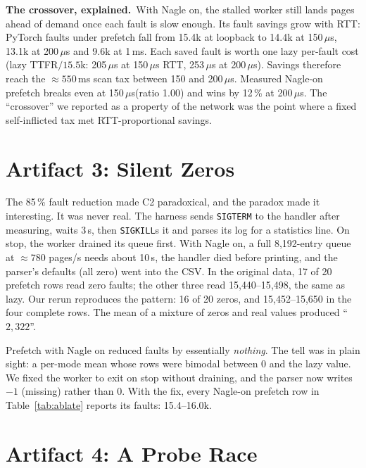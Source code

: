 \documentclass[conference]{IEEEtran}
\newcommand{\us}{\,$\mu$s\xspace}
\begin{document}
\textbf{The crossover, explained.}\, With Nagle on, the stalled worker still
lands pages ahead of demand once each fault is slow enough. Its fault savings
grow with RTT: PyTorch faults under prefetch fall from 15.4k at loopback to
14.4k at 150\us, 13.1k at 200\us and 9.6k at 1\,ms. Each saved fault is worth
one lazy per-fault cost (lazy TTFR$/15.5$k: 205\us at 150\us RTT, 253\us at
200\us). Savings therefore reach the ${\approx}550$\,ms scan tax between 150
and 200\us. Measured Nagle-on prefetch breaks even at 150\us (ratio 1.00) and
wins by 12\,\% at 200\us. The ``crossover'' we reported as a property of the
network was the point where a fixed self-inflicted tax met RTT-proportional
savings.

\section{Artifact 3: Silent Zeros}
\label{sec:zeros}

The 85\,\% fault reduction made C2 paradoxical, and the paradox made it
interesting. It was never real. The harness sends \texttt{SIGTERM} to the
handler after measuring, waits 3\,s, then \texttt{SIGKILL}s it and parses its
log for a statistics line. On stop, the worker drained its queue first. With
Nagle on, a full 8{,}192-entry queue at ${\approx}780$ pages/s needs about
10\,s,
the handler died before printing, and the parser's defaults (all zero) went
into the CSV. In the original data, 17 of 20 prefetch rows read zero faults;
the other three read 15{,}440--15{,}498, the same as lazy. Our rerun
reproduces the pattern: 16 of 20 zeros, and 15{,}452--15{,}650 in the four
complete rows. The mean of a mixture of zeros and real values produced
``$2{,}322$''.

Prefetch with Nagle on reduced faults by essentially \emph{nothing}. The
tell was in plain sight: a per-mode mean whose rows were bimodal between 0 and
the lazy value. We fixed the worker to exit on stop without draining, and the
parser now writes $-1$ (missing) rather than 0. With the fix, every
Nagle-on prefetch row in Table~\ref{tab:ablate} reports its faults:
15.4--16.0k.

\section{Artifact 4: A Probe Race}
\label{sec:probe}
\end{document}
